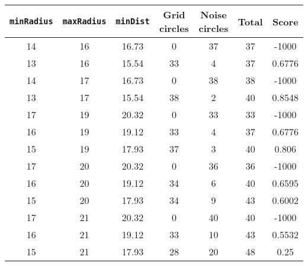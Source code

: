 \documentclass[letterpaper, 12pt]{article}
\begin{document}
\begin{longtable}{|c|c|c|c|c|c|c|}
\hline
\textbf{\texttt{minRadius}} & \textbf{\texttt{maxRadius}} & \textbf{\texttt{minDist}} & \textbf{Grid circles} & \textbf{Noise circles} & \textbf{Total} & \textbf{Score} \\
\hline
14 & 16 & 16.73 & 0 & 37 & 37 & -1000 \\
\hline
13 & 16 & 15.54 & 33 & 4 & 37 & 0.6776 \\
\hline
14 & 17 & 16.73 & 0 & 38 & 38 & -1000 \\
\hline
13 & 17 & 15.54 & 38 & 2 & 40 & 0.8548 \\
\hline
17 & 19 & 20.32 & 0 & 33 & 33 & -1000 \\
\hline
16 & 19 & 19.12 & 33 & 4 & 37 & 0.6776 \\
\hline
15 & 19 & 17.93 & 37 & 3 & 40 & 0.806 \\
\hline
17 & 20 & 20.32 & 0 & 36 & 36 & -1000 \\
\hline
16 & 20 & 19.12 & 34 & 6 & 40 & 0.6595 \\
\hline
15 & 20 & 17.93 & 34 & 9 & 43 & 0.6002 \\
\hline
17 & 21 & 20.32 & 0 & 40 & 40 & -1000 \\
\hline
16 & 21 & 19.12 & 33 & 10 & 43 & 0.5532 \\
\hline
15 & 21 & 17.93 & 28 & 20 & 48 & 0.25 \\
\hline
\end{longtable}
\end{document}
